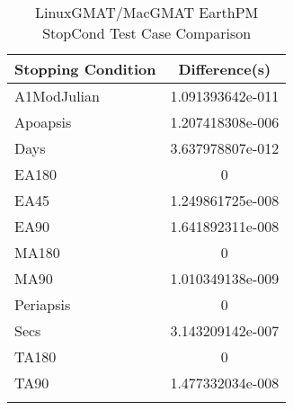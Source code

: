 \begin{table}[htbp!]
\centering
\caption{ LinuxGMAT/MacGMAT EarthPM StopCond Test Case Comparison}
      \begin{tabular}{lc}
      \hline\hline
          Stopping Condition & Difference(s) \\
         \hline
         A1ModJulian & 1.091393642e-011 \\
         Apoapsis & 1.207418308e-006 \\
         Days & 3.637978807e-012 \\
         EA180 & 0 \\
         EA45 & 1.249861725e-008 \\
         EA90 & 1.641892311e-008 \\
         MA180 & 0 \\
         MA90 & 1.010349138e-009 \\
         Periapsis & 0 \\
         Secs & 3.143209142e-007 \\
         TA180 & 0 \\
         TA90 & 1.477332034e-008 \\
      \hline\hline
      \label{Table: LinuxGMAT-MacGMAT EarthPM StopCond Table} 
\end{tabular}
\end{table}
